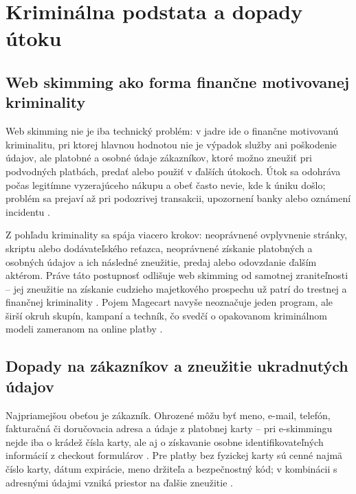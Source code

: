 \section{Kriminálna podstata a dopady útoku}

\subsection{Web skimming ako forma finančne motivovanej kriminality}

Web skimming nie je iba technický problém: v jadre ide o finančne motivovanú kriminalitu, pri ktorej hlavnou hodnotou nie je výpadok služby ani poškodenie údajov, ale platobné a osobné údaje zákazníkov, ktoré možno zneužiť pri podvodných platbách, predať alebo použiť v ďalších útokoch. Útok sa odohráva počas legitímne vyzerajúceho nákupu a obeť často nevie, kde k úniku došlo; problém sa prejaví až pri podozrivej transakcii, upozornení banky alebo oznámení incidentu \cite{cisa2020eskimming,europolDigitalSkimming,fbi2019eskimming,pciSsc2025PaymentPage}.

Z pohľadu kriminality sa spája viacero krokov: neoprávnené ovplyvnenie stránky, skriptu alebo dodávateľského reťazca, neoprávnené získanie platobných a osobných údajov a ich následné zneužitie, predaj alebo odovzdanie ďalším aktérom. Práve táto postupnosť odlišuje web skimming od samotnej zraniteľnosti -- jej zneužitie na získanie cudzieho majetkového prospechu už patrí do trestnej a finančnej kriminality \cite{cisa2020eskimming,europolDigitalSkimming,slovakCriminalCode2005}. Pojem Magecart navyše neoznačuje jeden program, ale širší okruh skupín, kampaní a techník, čo svedčí o opakovanom kriminálnom modeli zameranom na online platby \cite{fortinet2019MagecartSkimmer}.

\subsection{Dopady na zákazníkov a zneužitie ukradnutých údajov}

Najpriamejšou obeťou je zákazník. Ohrozené môžu byť meno, e-mail, telefón, fakturačná či doručovacia adresa a údaje z platobnej karty -- pri e-skimmingu nejde iba o krádež čísla karty, ale aj o získavanie osobne identifikovateľných informácií z checkout formulárov \cite{cisa2020eskimming}. Pre platby bez fyzickej karty sú cenné najmä číslo karty, dátum expirácie, meno držiteľa a bezpečnostný kód; v kombinácii s adresnými údajmi vzniká priestor na ďalšie zneužitie \cite{europolDigitalSkimming}.

